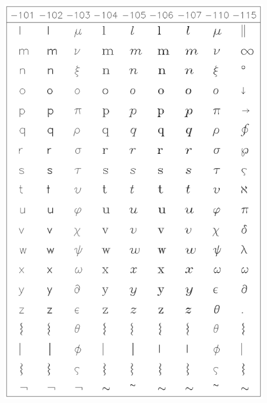 \documentclass[11pt]{article}
\begin{document}
\includegraphics[height=0.95\textheight]{sun83-c5.eps}
\end{document}
